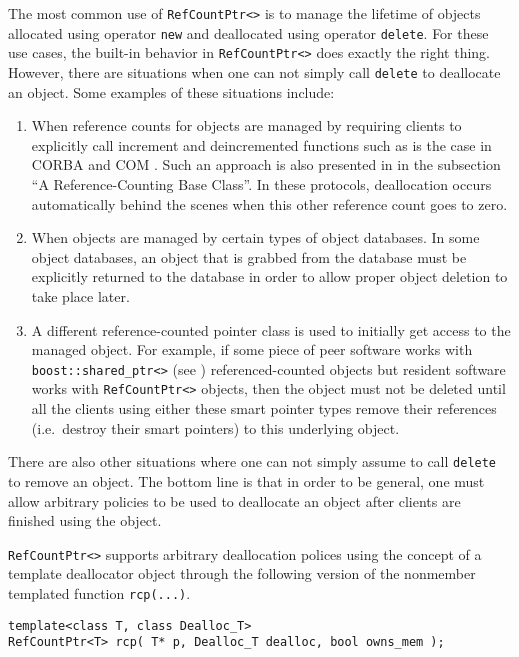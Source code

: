 The most common use of {}\texttt{RefCountPtr<>} is to manage the
lifetime of objects allocated using operator {}\texttt{new} and
deallocated using operator {}\texttt{delete}.  For these use cases,
the built-in behavior in {}\texttt{RefCountPtr<>} does exactly the
right thing.  However, there are situations when one can not simply
call {}\texttt{delete} to deallocate an object.  Some examples of
these situations include:
%
\begin{enumerate}
\item
When reference counts for objects are managed by requiring clients to
explicitly call increment and deincremented functions such as is the
case in CORBA {}\cite{ref:corba} and COM {}\cite{ref:com}.  Such an
approach is also presented in {}\cite[Item 29]{ref:meyers_1996} in the
subsection ``A Reference-Counting Base Class''.  In these protocols,
deallocation occurs automatically behind the scenes when this other
reference count goes to zero.
\item
When objects are managed by certain types of object databases.  In
some object databases, an object that is grabbed from the database must
be explicitly returned to the database in order to allow proper object
deletion to take place later.
\item
A different reference-counted pointer class is used to initially get
access to the managed object.  For example, if some piece of peer
software works with {}\texttt{boost::shared\_ptr<>} (see
{}\cite{ref:boost}) referenced-counted objects but resident software
works with {}\texttt{RefCountPtr<>} objects, then the object must not
be deleted until all the clients using either these smart pointer
types remove their references (i.e.~destroy their smart pointers) to
this underlying object.
\end{enumerate}
%
There are also other situations where one can not simply assume to call
{}\texttt{delete} to remove an object.  The bottom line is that in order
to be general, one must allow arbitrary policies to be used to
deallocate an object after clients are finished using the object.

{}\texttt{RefCountPtr<>} supports arbitrary deallocation polices using
the concept of a template deallocator object through the following
version of the nonmember templated function {}\texttt{rcp(...)}.

{\scriptsize\begin{verbatim}
template<class T, class Dealloc_T>
RefCountPtr<T> rcp( T* p, Dealloc_T dealloc, bool owns_mem );
\end{verbatim}}

